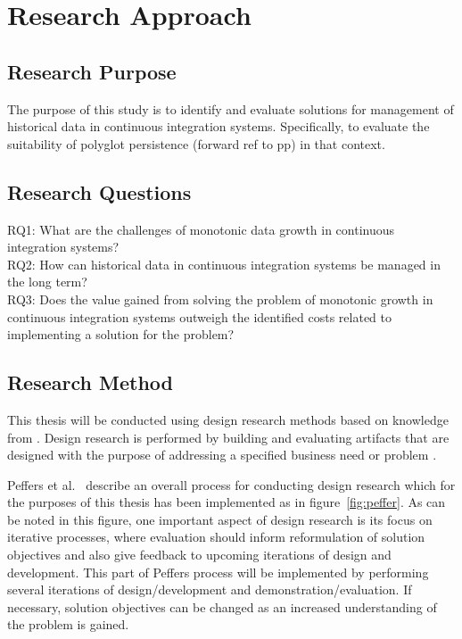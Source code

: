 \chapter{Research Approach}
\label{chap:research}

\section{Research Purpose}
The purpose of this study is to identify and evaluate solutions for management of historical data in continuous integration systems. Specifically, to evaluate the suitability of polyglot persistence (forward ref to pp) in that context.

\section{Research Questions}
RQ1: What are the challenges of monotonic data growth in continuous integration systems? \\
RQ2: How can historical data in continuous integration systems be managed in the long term? \\
RQ3: Does the value gained from solving the problem of monotonic growth in continuous integration systems outweigh the identified costs related to implementing a solution for the problem? \\

\section{Research Method}
This thesis will be conducted using design research methods based on knowledge from \cite{DS, Peffers, DesignEval}. Design research is performed by building and evaluating artifacts that are designed with the purpose of addressing a specified business need or problem \cite{DS}. 

Peffers et al.\ \cite{Peffers} describe an overall process for conducting design research which for the purposes of this thesis has been implemented as in figure~\ref{fig:peffer}. As can be noted in this figure, one important aspect of design research is its focus on iterative processes, where evaluation should inform reformulation of solution objectives and also give feedback to upcoming iterations of design and development. This part of Peffers process will be implemented by performing several iterations of design/development and demonstration/evaluation. If necessary, solution objectives can be changed as an increased understanding of the problem is gained. 

